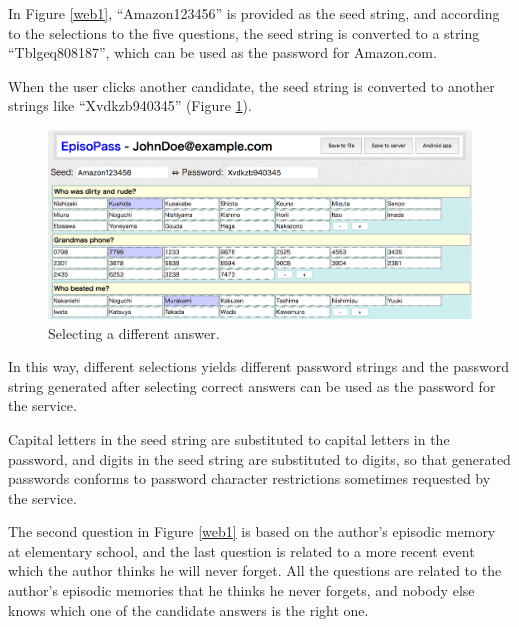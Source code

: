 \documentclass[runningheads,a4paper]{llncs}
\begin{document}
In Figure \ref{web1},
``\textsf{Amazon123456}'' is provided as the seed string,
and according to the selections to the five questions,
the seed string is converted to a string
``\textsf{Tblgeq808187}'',
which can be used as the password for Amazon.com.

When the user clicks another candidate,
the seed string is converted to another strings like
``\textsf{Xvdkzb940345}'' (Figure \ref{web11}).

\begin{figure}[H]
\centering
\includegraphics[width=1.0\columnwidth]{figures/8447eaba1ede0f678b3ce6fea63681f3}
\caption{Selecting a different answer.}
\label{web11}
\end{figure}

In this way, different selections yields different password strings and
the password string generated after selecting correct answers can be
used as the password for the service.

Capital letters in the seed string are substituted to capital letters in the password,
and digits in the seed string are substituted to digits,
so that generated passwords conforms to password character restrictions
sometimes requested by the service.


The second question in Figure \ref{web1}
is based on the author's episodic memory at elementary school,
and the last question is related to a more recent event
which the author thinks he will never forget.
All the questions are related to the author's episodic memories
that he thinks he never forgets, and nobody else knows which one of the
candidate answers is the right one.
\end{document}
